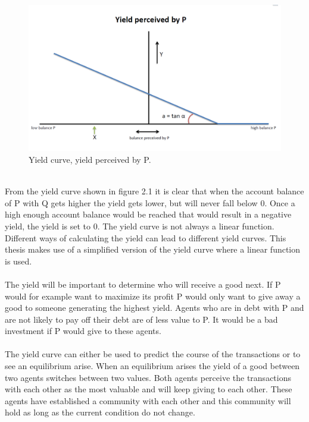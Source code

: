 \documentclass[twoside,openright]{uva-bachelor-thesis}
\begin{document}
\\
\begin{figure}[h!]
\centering
\includegraphics[scale=0.4]{YieldCurves/yieldcurve_P}
\caption{Yield curve, yield perceived by P.}
\end{figure}
\\
From the yield curve shown in figure 2.1 it is clear that when the account balance of P with Q gets higher the yield gets lower, but will never fall below 0. Once a high enough account balance would be reached that would result in a negative yield, the yield is set to 0. The yield curve is not always a linear function. Different ways of calculating the yield can lead to different yield curves. This thesis makes use of a simplified version of the yield curve where a linear function is used.
\\
\\
The yield will be important to determine who will receive a good next. If P would for example want to maximize its profit P would only want to give away a good to someone generating the highest yield. Agents who are in debt with P and are not likely to pay off their debt are of less value to P. It would be a bad investment if P would give to these agents.
\\
\\
The yield curve can either be used to predict the course of the transactions or to see an equilibrium arise. When an equilibrium arises the yield of a good between two agents switches between two values. Both agents perceive the transactions with each other as the most valuable and will keep giving to each other. These agents have established a community with each other and this community will hold as long as the current condition do not change. 
\end{document}
